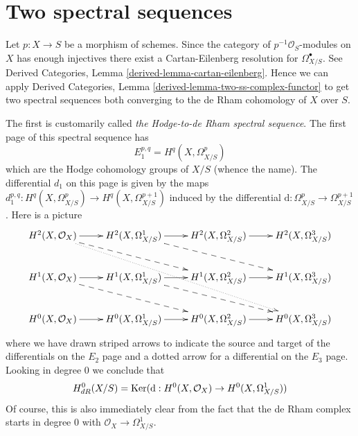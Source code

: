 \section{Two spectral sequences}
\label{section-hodge-to-de-rham}

\noindent
Let $p : X \to S$ be a morphism of schemes. Since the category
of $p^{-1}\mathcal{O}_S$-modules on $X$ has enough injectives
there exist a Cartan-Eilenberg resolution for $\Omega^\bullet_{X/S}$.
See Derived Categories, Lemma \ref{derived-lemma-cartan-eilenberg}.
Hence we can apply Derived Categories, Lemma
\ref{derived-lemma-two-ss-complex-functor} to get two spectral sequences
both converging to the de Rham cohomology of $X$ over $S$.

\medskip\noindent
The first is customarily called {\it the Hodge-to-de Rham spectral sequence}.
The first page of this spectral sequence has
$$
E_1^{p, q} = H^q(X, \Omega^p_{X/S})
$$
which are the Hodge cohomology groups of $X/S$ (whence the name). The
differential $d_1$ on this page is given by the maps
$d_1^{p, q} : H^q(X, \Omega^p_{X/S}) \to H^q(X, \Omega^{p + 1}_{X/S})$
induced by the differential
$\text{d} : \Omega^p_{X/S} \to \Omega^{p + 1}_{X/S}$.
Here is a picture
$$
\xymatrix{
H^2(X, \mathcal{O}_X) \ar[r] \ar@{-->}[rrd] \ar@{..>}[rrrdd] &
H^2(X, \Omega^1_{X/S}) \ar[r] \ar@{-->}[rrd] &
H^2(X, \Omega^2_{X/S}) \ar[r] &
H^2(X, \Omega^3_{X/S}) \\
H^1(X, \mathcal{O}_X) \ar[r] \ar@{-->}[rrd] &
H^1(X, \Omega^1_{X/S}) \ar[r] \ar@{-->}[rrd] &
H^1(X, \Omega^2_{X/S}) \ar[r] &
H^1(X, \Omega^3_{X/S}) \\
H^0(X, \mathcal{O}_X) \ar[r] &
H^0(X, \Omega^1_{X/S}) \ar[r] &
H^0(X, \Omega^2_{X/S}) \ar[r] &
H^0(X, \Omega^3_{X/S})
}
$$
where we have drawn striped arrows to indicate the source and target of
the differentials on the $E_2$ page and a dotted arrow for a differential
on the $E_3$ page. Looking in degree $0$ we conclude that
$$
H^0_{dR}(X/S) =
\mathop{\mathrm{Ker}}(\text{d} : H^0(X, \mathcal{O}_X) \to H^0(X, \Omega^1_{X/S}))
$$
Of course, this is also immediately clear from the fact that the
de Rham complex starts in degree $0$ with $\mathcal{O}_X \to \Omega^1_{X/S}$.


